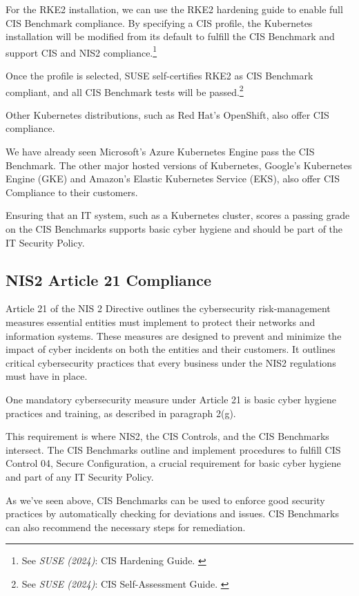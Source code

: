 For the RKE2 installation, we can use the RKE2 hardening guide to enable full CIS Benchmark compliance. By specifying a CIS profile, the Kubernetes installation will be modified from its default to fulfill the CIS Benchmark and support CIS and NIS2 compliance.\footnote{See \textit{SUSE (2024)}: CIS Hardening Guide. \cite{rke2Hardening}}

Once the profile is selected, SUSE self-certifies RKE2 as CIS Benchmark compliant, and all CIS Benchmark tests will be passed.\footnote{See \textit{SUSE (2024)}: CIS Self-Assessment Guide. \cite{rke2Self}}

Other Kubernetes distributions, such as Red Hat's OpenShift, also offer CIS compliance. 

We have already seen Microsoft's Azure Kubernetes Engine pass the CIS Benchmark. The other major hosted versions of Kubernetes, Google's Kubernetes Engine (GKE) and Amazon's Elastic Kubernetes Service (EKS), also offer CIS Compliance to their customers.

Ensuring that an IT system, such as a Kubernetes cluster, scores a passing grade on the CIS Benchmarks supports basic cyber hygiene and should be part of the IT Security Policy.

\subsection{NIS2 Article 21 Compliance}

Article 21 of the NIS 2 Directive outlines the cybersecurity risk-management measures essential entities must implement to protect their networks and information systems. These measures are designed to prevent and minimize the impact of cyber incidents on both the entities and their customers. It outlines critical cybersecurity practices that every business under the NIS2 regulations must have in place. 

One mandatory cybersecurity measure under Article 21 is basic cyber hygiene practices and training, as described in paragraph 2(g).

This requirement is where NIS2, the CIS Controls, and the CIS Benchmarks intersect. The CIS Benchmarks outline and implement procedures to fulfill CIS Control 04, Secure Configuration, a crucial requirement for basic cyber hygiene and part of any IT Security Policy.

As we've seen above, CIS Benchmarks can be used to enforce good security practices by automatically checking for deviations and issues. CIS Benchmarks can also recommend the necessary steps for remediation.

